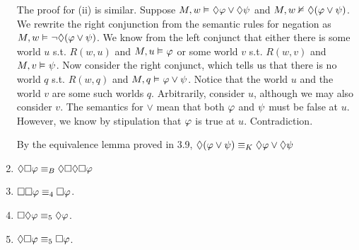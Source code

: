 \documentclass[a4paper, 11pt]{article}                  %
\begin{document}
\begin{enumerate}
{      The proof for (ii) is similar. Suppose $M,w \MLmodels \Diamond \metaA \vee \Diamond \metaB$ and $M, w \nMLmodels \Diamond(\metaA \vee \metaB)$. We rewrite the right conjunction from the semantic rules for negation as $M, w \MLmodels \neg \Diamond(\metaA \vee \metaB)$. We know from the left conjunct that either there is some world $u$ s.t. $R(w,u)$ and $M,u \MLmodels \metaA$ or some world $v$ s.t. $R(w,v)$ and $M,v \MLmodels \metaB$. Now consider the right conjunct, which tells us that there is no world $q$ s.t. $R(w,q)$ and $M, q \MLmodels \metaA \vee \metaB$. Notice that the world $u$ and the world $v$ are some such worlds $q$. Arbitrarily, consider $u$, although we may also consider $v$. The semantics for $\vee$ mean that both $\metaA$ and $\metaB$ must be false at $u$. However, we know by stipulation that $\metaA$ is true at $u$. Contradiction. 

      By the equivalence lemma proved in 3.9, $\Diamond(\metaA \vee \metaB) \MLequiv[K]  \Diamond\metaA \vee \Diamond\metaB$
    }

    \item $\Diamond\Box \metaA \MLequiv[B] \Diamond\Box\Diamond\Box\metaA$ 

    \item $\Box\Box \metaA \MLequiv[4] \Box \metaA$.

    \item $\Box\Diamond \metaA \MLequiv[5] \Diamond \metaA$.

    \item $\Diamond\Box \metaA \MLequiv[5] \Box \metaA$.

\end{enumerate}



\end{document}
